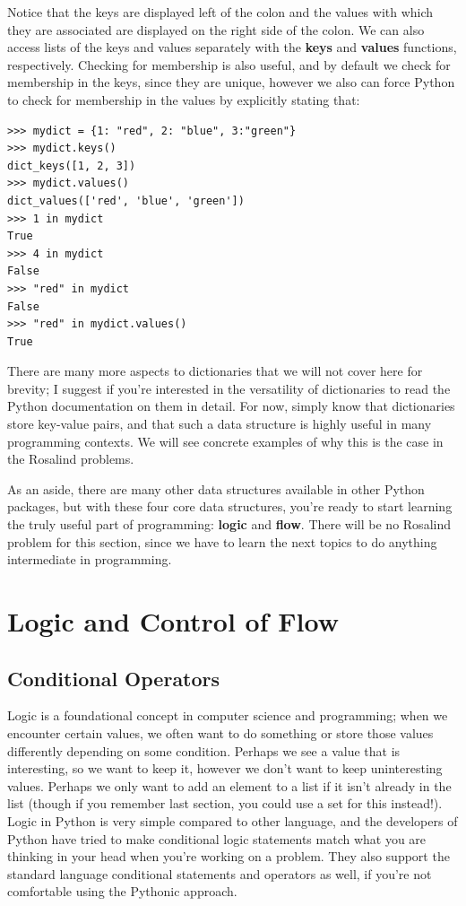 \documentclass[a4paper,11pt]{article}
\begin{document}
Notice that the keys are displayed left of the colon and the values with which they are associated are 
displayed on the right side of the colon.  We can also access lists of the keys and values separately 
with the \textbf{keys} and \textbf{values} functions, respectively.  Checking for membership is also 
useful, and by default we check for membership in the keys, since they are unique, however we also
can force Python to check for membership in the values by explicitly stating that:

\vspace{3mm}
\begin{lstlisting}
>>> mydict = {1: "red", 2: "blue", 3:"green"}
>>> mydict.keys()
dict_keys([1, 2, 3])
>>> mydict.values()
dict_values(['red', 'blue', 'green'])
>>> 1 in mydict
True
>>> 4 in mydict
False
>>> "red" in mydict
False
>>> "red" in mydict.values()
True
\end{lstlisting}
\vspace{3mm}

There are many more aspects to dictionaries that we will not cover here for brevity; I suggest if you're 
interested in the versatility of dictionaries to read the Python documentation on them in detail.  For now, 
simply know that dictionaries store key-value pairs, and that such a data structure is highly useful in 
many programming contexts.  We will see concrete examples of why this is the case in the Rosalind problems. \par

As an aside, there are many other data structures available in other Python packages, but with these four 
core data structures, you're ready to start learning the truly useful part of programming: \textbf{logic} and 
\textbf{flow}.  There will be no Rosalind problem for this section, since we have to learn the next topics 
to do anything intermediate in programming.


\pagebreak
\section{Logic and Control of Flow}
\subsection{Conditional Operators}
Logic is a foundational concept in computer science and programming; when we encounter certain values, 
we often want to do something or store those values differently depending on some condition.  Perhaps 
we see a value that is interesting, so we want to keep it, however we don't want to keep uninteresting 
values.  Perhaps we only want to add an element to a list if it isn't already in the list (though 
if you remember last section, you could use a set for this instead!).  Logic in Python is very 
simple compared to other language, and the developers of Python have tried to make conditional logic 
statements match what you are thinking in your head when you're working on a problem.  They also 
support the standard language conditional statements and operators as well, if you're not comfortable 
using the Pythonic approach.  \par
\end{document}
